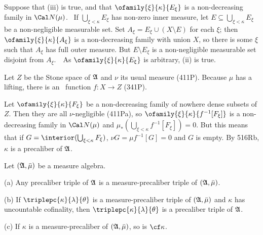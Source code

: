 {\medskip

 Suppose that (iii) is true, and that
$\ofamily{\xi}{\kappa}{E_{\xi}}$ is a non-decreasing family in
$\Cal N(\mu)$.   \Quer\ If $\bigcup_{\xi<\kappa}E_{\xi}$ has non-zero
inner measure, let $E\subseteq\bigcup_{\xi<\kappa}E_{\xi}$ be a
non-negligible measurable set.   Set $A_{\xi}=E_{\xi}\cup(X\setminus E)$
for each $\xi$;  then $\ofamily{\xi}{\kappa}{A_{\xi}}$ is a
non-decreasing family with union $X$, so there is some $\xi$ such that
$A_{\xi}$ has full outer measure.   But $E\setminus E_{\xi}$ is a
non-negligible measurable set disjoint from $A_{\xi}$.\ \BanG\
As $\ofamily{\xi}{\kappa}{E_{\xi}}$ is arbitrary, (ii) is true.

\medskip

 Let $Z$ be the Stone space of
$\frak A$ and $\nu$ its usual
measure (411P).   Because $\mu$ has a lifting, there is an \imp\ function
$f:X\to Z$ (341P).

Let $\ofamily{\xi}{\kappa}{F_{\xi}}$ be a non-decreasing family of
nowhere dense subsets of $Z$.    Then they are all $\nu$-negligible
(411Pa),
so $\ofamily{\xi}{\kappa}{f^{-1}[F_{\xi}]}$ is a non-decreasing family
in $\Cal N(\mu)$ and $\mu_*(\bigcup_{\xi<\kappa}f^{-1}[F_{\xi}])=0$.
But this means that if $G=\interior(\bigcup_{\xi<\kappa}F_{\xi})$,
$\nu G=\mu f^{-1}[G]=0$ and $G$ is empty.   By 516Rb, $\kappa$ is a
precaliber of $\frak A$.
}%

 Let $(\frak A,\bar\mu)$ be a measure algebra.

(a) Any precaliber triple of $\frak A$ is a measure-precaliber triple of
$(\frak A,\bar\mu)$.

(b) If $\triplepc{\kappa}{\lambda}{\theta}$ is a measure-precaliber
triple of $(\frak A,\bar\mu)$ and $\kappa$ has uncountable cofinality,
then $\triplepc{\kappa}{\lambda}{\theta}$ is a precaliber triple of
$\frak A$.

(c) If $\kappa$ is a measure-precaliber of $(\frak A,\bar\mu)$, so is
$\cf\kappa$.


